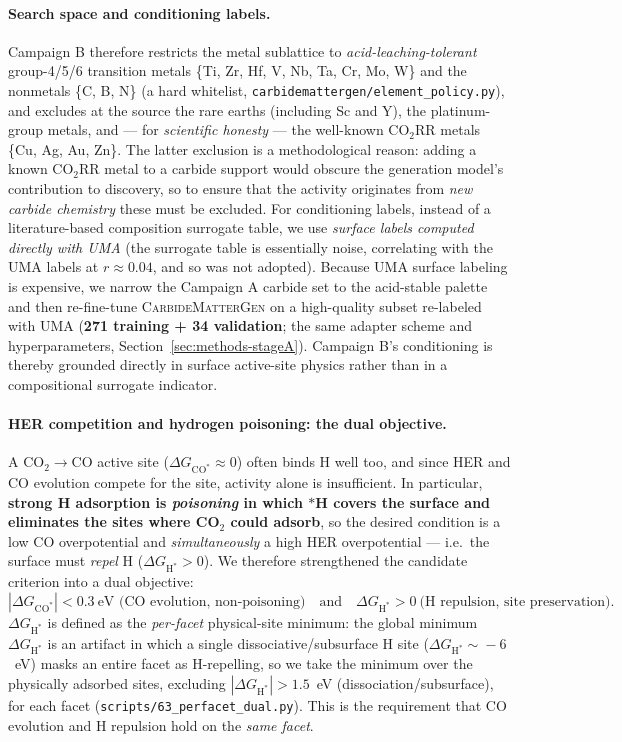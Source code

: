 \documentclass[11pt,a4paper]{report}
\newcommand{\dGCO}{\Delta G_{\mathrm{CO^*}}}
\newcommand{\dGH}{\Delta G_{\mathrm{H^*}}}
\begin{document}
\paragraph{Search space and conditioning labels.} Campaign B therefore restricts the metal sublattice to \emph{acid-leaching-tolerant} group-4/5/6
transition metals \{Ti, Zr, Hf, V, Nb, Ta, Cr, Mo, W\} and the nonmetals \{C, B, N\} (a hard whitelist,
\texttt{carbidemattergen/element\_policy.py}), and excludes at the source the rare earths (including Sc and Y), the platinum-group metals, and --- for
\emph{scientific honesty} --- the well-known CO$_2$RR metals \{Cu, Ag, Au, Zn\}. The latter exclusion is a methodological
reason: adding a known CO$_2$RR metal to a carbide support would obscure the generation model's contribution to discovery, so to ensure that the activity
originates from \emph{new carbide chemistry} these must be excluded. For conditioning labels, instead of a literature-based composition surrogate table, we use
\emph{surface labels computed directly with UMA} (the surrogate table is essentially noise, correlating with the UMA labels at $r\!\approx\!0.04$, and so was not adopted).
Because UMA surface labeling is expensive, we narrow the Campaign A carbide set to the acid-stable palette and then re-fine-tune
\textsc{CarbideMatterGen} on a high-quality subset re-labeled with UMA (\textbf{271 training + 34 validation};
the same adapter scheme and hyperparameters, Section~\ref{sec:methods-stageA}). Campaign B's conditioning is thereby grounded directly in surface active-site
physics rather than in a compositional surrogate indicator.

\paragraph{HER competition and hydrogen poisoning: the dual objective.} A CO$_2\!\to\!$CO active site ($\dGCO\!\approx\!0$) often binds H well too,
and since HER and CO evolution compete for the site, activity alone is insufficient. In particular, \textbf{strong H adsorption is
\emph{poisoning} in which $*$H covers the surface and eliminates the sites where CO$_2$ could adsorb}, so the desired condition is a low CO overpotential
and \emph{simultaneously} a high HER overpotential --- i.e.\ the surface must \emph{repel} H ($\dGH>0$). We therefore strengthened the candidate criterion
into a dual objective:
\[
|\dGCO|<0.3~\text{eV (CO evolution, non-poisoning)} \quad\text{and}\quad \dGH>0~\text{(H repulsion, site preservation)}.
\]
$\dGH$ is defined as the \emph{per-facet} physical-site minimum: the global minimum $\dGH$ is an artifact in which a single dissociative/subsurface H
site ($\dGH\!\sim\!-6$~eV) masks an entire facet as H-repelling, so we take the minimum over the physically adsorbed sites, excluding
$|\dGH|>1.5$~eV (dissociation/subsurface), for each facet (\texttt{scripts/63\_perfacet\_dual.py}). This is the requirement that CO evolution and
H repulsion hold on the \emph{same facet}.
\end{document}
